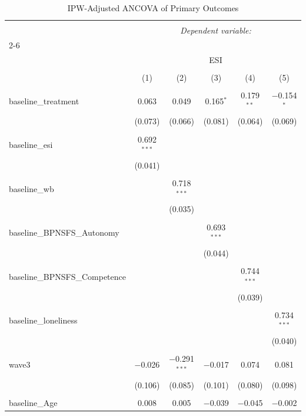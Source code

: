 
\begin{table}[!htbp] \centering 
  \caption{IPW-Adjusted ANCOVA of Primary Outcomes} 
  \label{} 
\begin{tabular}{@{\extracolsep{5pt}}lccccc} 
\\[-1.8ex]\hline 
\hline \\[-1.8ex] 
 & \multicolumn{5}{c}{\textit{Dependent variable:}} \\ 
\cline{2-6} 
\\[-1.8ex] & \multicolumn{5}{c}{ESI} \\ 
\\[-1.8ex] & (1) & (2) & (3) & (4) & (5)\\ 
\hline \\[-1.8ex] 
 baseline\_treatment & 0.063 & 0.049 & 0.165$^{*}$ & 0.179$^{**}$ & $-$0.154$^{*}$ \\ 
  & (0.073) & (0.066) & (0.081) & (0.064) & (0.069) \\ 
  & & & & & \\ 
 baseline\_esi & 0.692$^{***}$ &  &  &  &  \\ 
  & (0.041) &  &  &  &  \\ 
  & & & & & \\ 
 baseline\_wb &  & 0.718$^{***}$ &  &  &  \\ 
  &  & (0.035) &  &  &  \\ 
  & & & & & \\ 
 baseline\_BPNSFS\_Autonomy &  &  & 0.693$^{***}$ &  &  \\ 
  &  &  & (0.044) &  &  \\ 
  & & & & & \\ 
 baseline\_BPNSFS\_Competence &  &  &  & 0.744$^{***}$ &  \\ 
  &  &  &  & (0.039) &  \\ 
  & & & & & \\ 
 baseline\_loneliness &  &  &  &  & 0.734$^{***}$ \\ 
  &  &  &  &  & (0.040) \\ 
  & & & & & \\ 
 wave3 & $-$0.026 & $-$0.291$^{***}$ & $-$0.017 & 0.074 & 0.081 \\ 
  & (0.106) & (0.085) & (0.101) & (0.080) & (0.098) \\ 
  & & & & & \\ 
 baseline\_Age & 0.008 & 0.005 & $-$0.039 & $-$0.045 & $-$0.002 \\ 

\end{tabular}
\end{table}
